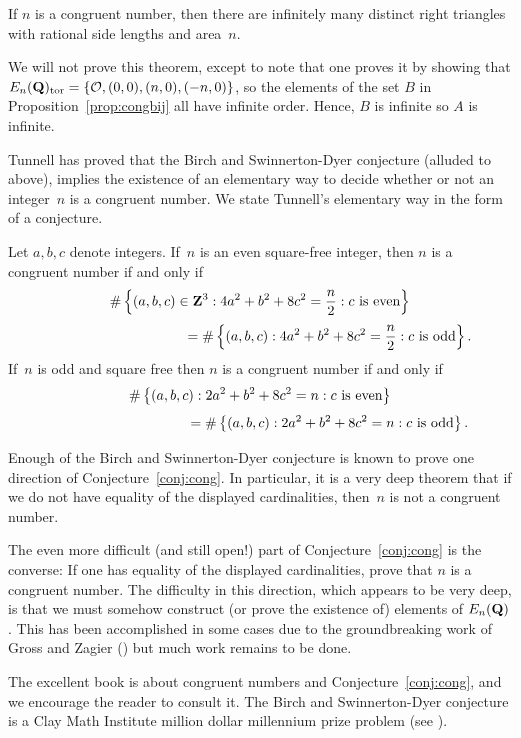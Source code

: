 \begin{theorem}\label{thm:inftri}
If $n$ is a congruent number, then there are infinitely
many distinct right triangles with rational side lengths
and area~$n$.
\end{theorem}
We will not prove this theorem, except to note that one proves it by showing that
$E_n(\mathbf{Q})_{\operatorname{tor}} = \{\mathcal{O},(0,0),(n,0),(-n,0)\}$, so the
elements of the set $B$ in Proposition~\ref{prop:congbij} all have
infinite order. Hence, $B$ is infinite
so $A$ is infinite.


Tunnell has proved that the Birch and Swinnerton-Dyer conjecture
(alluded to above), implies the existence of an elementary way to
decide whether or not an integer~$n$ is a congruent number.  We state
Tunnell's elementary way in the form of a conjecture.
\begin{conjecture}\label{conj:cong}
Let $a,b,c$ denote integers.
If~$n$ is an even square-free integer, then
$n$ is a congruent number if and only if
$$
\#\left\{(a,b,c)\in\mathbf{Z}^3 : 4a^2 + b^2 + 8c^2 = \frac{n}{2} : c\text{\rm{} is even}\right\}$$
$$
  \qquad\qquad\qquad\qquad\qquad   =
  \#\left\{(a,b,c) : 4a^2 + b^2 + 8c^2 = \frac{n}{2}: c\text{\rm{} is odd}\right\}.$$
If~$n$ is odd and square free then
$n$ is a congruent number if and only if
$$\#\left\{(a,b,c) : 2a^2 + b^2 + 8c^2 = n : c\text{\rm{} is even}\right\}$$
$$  \qquad\qquad\qquad\qquad\qquad =
    \#\left\{(a,b,c) : 2a^2 + b^2 + 8c^2 = n: c\text{\rm{} is odd}\right\}.$$
\end{conjecture}

Enough of the Birch and Swinnerton-Dyer conjecture is known to prove
one direction of Conjecture~\ref{conj:cong}.  In particular, it is a
very deep theorem that if we do not have equality of the displayed
cardinalities, then~$n$ is not a congruent
number.


The even more difficult (and still open!) part of
Conjecture~\ref{conj:cong} is the converse: If one has equality of the
displayed cardinalities, prove that $n$ is a congruent number.  The
difficulty in this direction, which appears to be very deep, is that
we must somehow construct (or prove the existence of) elements of
$E_n(\mathbf{Q})$.  This has been accomplished in some cases due to the
groundbreaking work of Gross and Zagier (\cite{gross-zagier}) but much
work remains to be done.

The excellent book \cite{koblitz:cong} is about congruent numbers and
Conjecture~\ref{conj:cong}, and we encourage the reader to consult it.
The Birch and Swinnerton-Dyer conjecture is a Clay Math Institute
million dollar millennium prize problem (see \cite{cmi, wiles:cmi}).


